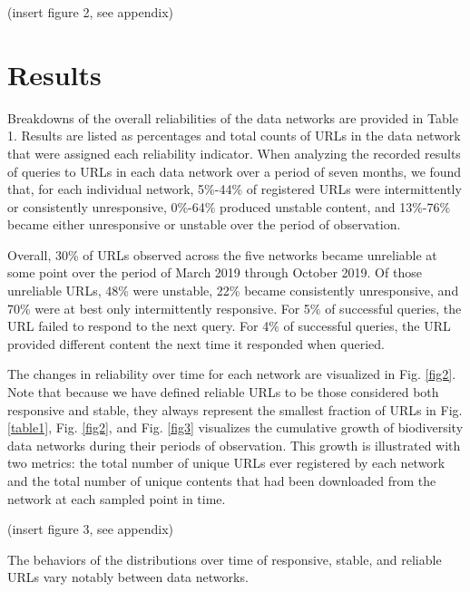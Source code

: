 % 
(insert figure 2, see appendix)

\section*{Results}

Breakdowns of the overall reliabilities of the data networks are provided in Table 1. Results are listed as percentages and total counts of URLs in the data network that were assigned each reliability indicator. When analyzing the recorded results of queries to URLs in each data network over a period of seven months, we found that, for each individual network, 5\%-44\% of registered URLs were intermittently or consistently unresponsive, 0\%-64\% produced unstable content, and 13\%-76\% became either unresponsive or unstable over the period of observation.

Overall, 30\% of URLs observed across the five networks became unreliable at some point over the period of March 2019 through October 2019. Of those unreliable URLs, 48\% were unstable, 22\% became consistently unresponsive, and 70\% were at best only intermittently responsive. For 5\% of successful queries, the URL failed to respond to the next query. For 4\% of successful queries, the URL provided different content the next time it responded when queried.

The changes in reliability over time for each network are visualized in Fig. \ref{fig2}. Note that because we have defined reliable URLs to be those considered both responsive and stable, they always represent the smallest fraction of URLs in Fig. \ref{table1}, Fig. \ref{fig2}, and Fig. \ref{fig3} visualizes the cumulative growth of biodiversity data networks during their periods of observation. This growth is illustrated with two metrics: the total number of unique URLs ever registered by each network and the total number of unique contents that had been downloaded from the network at each sampled point in time.

% 
(insert figure 3, see appendix)


The behaviors of the distributions over time of responsive, stable, and reliable URLs vary notably between data networks. 

